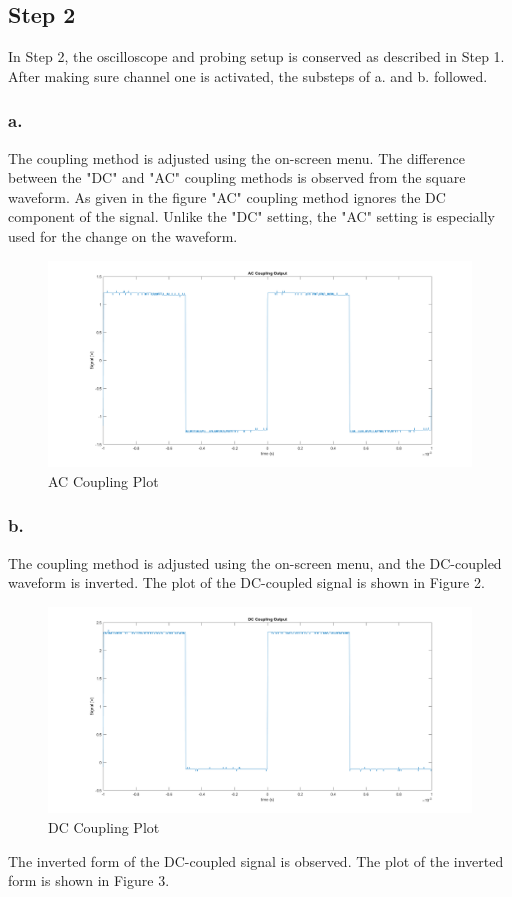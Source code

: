 \documentclass[letterpaper,12pt]{article}
\begin{document}
\subsection{Step 2}
In Step 2, the oscilloscope and probing setup is conserved as described in Step 1. After making sure channel one is activated, the substeps of a. and b. followed.
\subsubsection{a.}
The coupling method is adjusted using the on-screen menu. The difference between the "DC" and "AC" coupling methods is observed from the square waveform. As given in the figure "AC" coupling method ignores the DC component of the signal. Unlike the "DC" setting, the "AC" setting is especially used for the change on the waveform.
\begin{figure}[H]
	\caption{AC Coupling Plot}
	\centering
	\includegraphics[width=1\textwidth]{2a.png}
\end{figure}

\subsubsection{b.}
The coupling method is adjusted using the on-screen menu, and the DC-coupled waveform is inverted. The plot of the DC-coupled signal is shown in Figure 2.

\begin{figure}[H]
	\caption{DC Coupling Plot}
	\centering
	\includegraphics[width=1\textwidth]{2b1.png}
\end{figure}
The inverted form of the DC-coupled signal is observed. The plot of the inverted form is shown in Figure 3.
\end{document}
